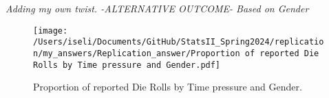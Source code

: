 \documentclass[12pt,letterpaper]{article}
\begin{document}
\noindent \textit{Adding my own twist. -ALTERNATIVE OUTCOME- Based on Gender} \\

	 

\begin{figure}[ht]
	\centering
	\texttt{[image: /Users/iseli/Documents/GitHub/StatsII\_Spring2024/replication/my\_answers/Replication\_answer/Proportion of reported Die Rolls by Time pressure and Gender.pdf]}
	\caption{Proportion of reported Die Rolls by Time pressure and Gender.}
	\label{fig:dieRollsTimePressureandGender}
\end{figure}
\end{document}
